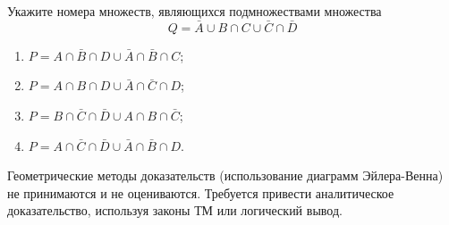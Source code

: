 \question
Укажите номера множеств, являющихся подмножествами множества
\begin{equation*}
	Q = \bar{A} \cup B \cap C \cup \bar{C} \cap \bar{D}
\end{equation*}

\begin{enumerate}
	\renewcommand{\labelenumi}{\arabic{enumi})}
	\item $P = A \cap \bar{B} \cap D \cup \bar{A} \cap \bar{B} \cap C$;
	\item $P = A \cap B \cap D \cup \bar{A} \cap \bar{C} \cap D$;
	\item $P = B \cap \bar{C} \cap \bar{D} \cup A \cap B \cap \bar{C}$;
	\item $P = A \cap \bar{C} \cap \bar{D} \cup \bar{A} \cap \bar{B} \cap D$.
\end{enumerate}

Геометрические методы доказательств (использование диаграмм Эйлера-Венна) не принимаются и не оцениваются. Требуется привести аналитическое доказательство, используя законы ТМ или логический вывод.
